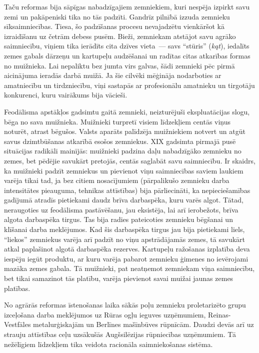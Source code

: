 \documentclass[twoside,a5paper,12pt,fleqn,openany]{extbook}
\newcommand{\pltxti}[1]{\textit{\textpolish{#1}}}
\begin{document}
Taču reformas bija sāpīgas nabadzīgajiem zemniekiem, kuri nespēja izpirkt savu zemi un pakāpeniski tika no tās padzīti. Gandrīz pilnībā izzuda zemnieku sīksaimniecības. Tiesa, šo padzīšanas procesu nevajadzētu vienkāršot kā izraidīšanu uz četrām debess pusēm. Bieži, zemniekam atstājot savu agrāko saimniecību, viņiem tika ierādīts cita dzīves vieta~--- savs ``stūris'' (\pltxti{kąt}), iedalīts zemes gabals dārzeņu un kartupeļu audzēšanai un radītas citas atkarības formas no muižnieka. Lai nepaliktu bez jumta virs galvas, šādi zemnieki pēc pirmā aicinājuma ieradās darbā muižā. Ja šie cilvēki mēģināja nodarboties ar amatniecību un tirdzniecību, viņi sastapās ar profesionālu amatnieku un tirgotāju konkurenci, kuru vairākums bija vācieši.

Feodālisma apstākļos gadsimtu gaitā zemnieki, neizturējuši ekspluatācijas slogu, bēga no sava muižnieka. Muižnieki turpretī visiem līdzekļiem centās viņus noturēt, atrast bēgušos. Valsts aparāts palīdzēja muižniekiem notvert un atgūt savus dzimtbūšanas atkarībā esošos zemniekus. XIX gadsimta pirmajā pusē situācijas radikāli mainījās: muižnieki padzina daļu nabadzīgāko zemnieku no zemes, bet pēdējie savukārt pretojās, centās saglabāt savu saimniecību. Ir skaidrs, ka muižnieki padzīt zemniekus un pievienot viņu saimniecības saviem laukiem varēja tikai tad, ja bez citiem nosacījumiem (pārpalikušo zemnieku darba intensitātes pieauguma, tehnikas attīstības) bija pārliecināti, ka nepieciešamības gadījumā atradīs pietiekami daudz brīva darbaspēka, kuru varēs algot. Tātad, neraugoties uz feodālisma pastāvēšanu, jau eksistēja, lai arī ierobežots, brīva algota darbaspēka tirgus. Tas bija radies pateicoties zemnieku bēgšanai un klīšanai darba meklējumos. Kad šis darbaspēka tirgus jau bija pietiekami liels, ``liekos'' zemniekus varēja arī padzīt no viņu apstrādājamās zemes, tā savukārt atkal paplašinot algotā darbaspēka rezerves. Kartupeļu ražošanas izplatība deva iespēju iegūt produktu, ar kuru varēja pabarot zemnieku ģimenes no ievērojami mazāka zemes gabala. Tā muižnieki, pat neatņemot zemniekam viņa saimniecību, bet tikai samazinot tās platību, varēja pievienot savai muižai jaunas zemes platības.

No agrārās reformas īstenošanas laika sākās poļu zemnieku proletarizēto grupu izceļošana darba meklējumos uz Rūras ogļu ieguves uzņēmumiem, Reinas-Vestfāles metalurģiskajām un Berlīnes mašīnbūves rūpnīcām. Daudzi devās arī uz strauju attīstības ceļu uzsākušās Augšsilēzijas rūpniecības uzņēmumiem. Tā nežēlīgiem līdzekļiem tika veidota racionāla saimniekošanas sistēma.
\end{document}
